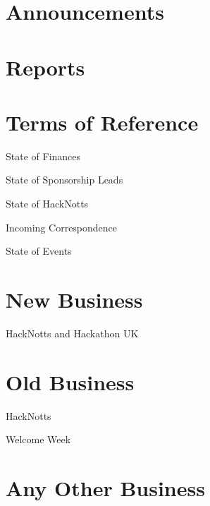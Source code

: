 \documentclass[11pt,hacksoc,agenda]{meetingmins}
\begin{document}
\maketitle

\section{Announcements}
\begin{items}
\item
\end{items}

\section{Reports}

\section{Terms of Reference}
\begin{items}
\item {State of Finances}
\item {State of Sponsorship Leads}
\item {State of HackNotts}
\item {Incoming Correspondence}
\item {State of Events}
\end{items}

\section{New Business}
\begin{items}
\item{HackNotts and Hackathon UK}
\end{items}

\section{Old Business}
\begin{items}
\item{HackNotts}
\item{Welcome Week}
\end{items}

\section{Any Other Business}

\vspace{1em}
\end{document}

